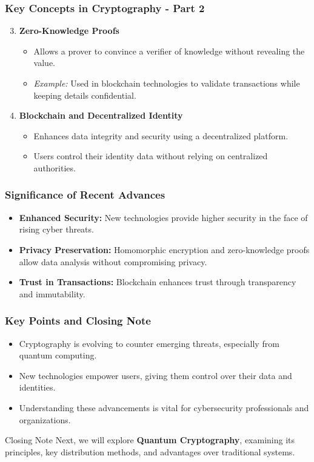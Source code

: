 \documentclass{beamer}
\begin{document}
\begin{frame}[fragile]
    \frametitle{Key Concepts in Cryptography - Part 2}
    \begin{enumerate}
        \setcounter{enumi}{2}
        \item \textbf{Zero-Knowledge Proofs}
            \begin{itemize}
                \item Allows a prover to convince a verifier of knowledge without revealing the value.
                \item \textit{Example:} Used in blockchain technologies to validate transactions while keeping details confidential.
            \end{itemize}
        \item \textbf{Blockchain and Decentralized Identity}
            \begin{itemize}
                \item Enhances data integrity and security using a decentralized platform.
                \item Users control their identity data without relying on centralized authorities.
            \end{itemize}
    \end{enumerate}
\end{frame}

\begin{frame}[fragile]
    \frametitle{Significance of Recent Advances}
    \begin{itemize}
        \item \textbf{Enhanced Security:} New technologies provide higher security in the face of rising cyber threats.
        \item \textbf{Privacy Preservation:} Homomorphic encryption and zero-knowledge proofs allow data analysis without compromising privacy.
        \item \textbf{Trust in Transactions:} Blockchain enhances trust through transparency and immutability.
    \end{itemize}
\end{frame}

\begin{frame}[fragile]
    \frametitle{Key Points and Closing Note}
    \begin{itemize}
        \item Cryptography is evolving to counter emerging threats, especially from quantum computing.
        \item New technologies empower users, giving them control over their data and identities.
        \item Understanding these advancements is vital for cybersecurity professionals and organizations.
    \end{itemize}
    \begin{block}{Closing Note}
        Next, we will explore \textbf{Quantum Cryptography}, examining its principles, key distribution methods, and advantages over traditional systems.
    \end{block}
\end{frame}
\end{document}
